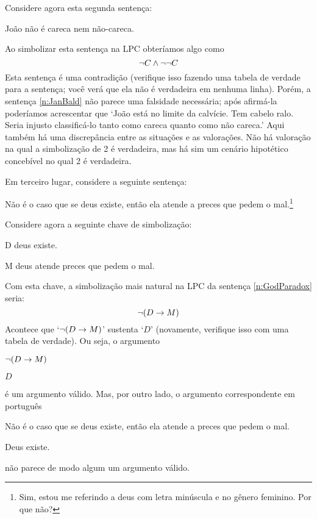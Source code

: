 Considere agora esta segunda sentença:
	\begin{earg} \setcounter{eargnum}{1}
		\item\label{n:JanBald} João não é careca nem não-careca.
	\end{earg}
Ao simbolizar esta sentença na LPC obteríamos algo como
$$\neg C \wedge \neg \neg C$$
Esta sentença é uma contradição (verifique isso fazendo uma tabela de verdade para a sentença; você verá que ela não é verdadeira em nenhuma linha).
Porém, a sentença \ref{n:JanBald} não parece uma falsidade necessária; após afirmá-la poderíamos acrescentar que `João está no limite da calvície.
Tem cabelo ralo. Seria injusto classificá-lo tanto como careca quanto como não careca.'
Aqui também há uma discrepância entre as situações e as valorações.
Não há valoração na qual a simbolização de 2 é verdadeira, mas há sim um cenário hipotético concebível no qual 2 é verdadeira.

Em terceiro lugar, considere a seguinte sentença:
	\begin{earg}
\setcounter{eargnum}{2}	
		\item\label{n:GodParadox}	Não é o caso que se deus existe, então ela atende a preces que pedem o mal.\footnote{ Sim, estou me referindo a deus com letra minúscula e no gênero feminino. Por que não?}
	\end{earg}
Considere agora a seguinte chave de simbolização:
\begin{ekey}
	\item[D] deus existe.
	\item[M] deus atende preces que pedem o mal.
\end{ekey}
Com esta chave, a simbolização mais natural na LPC da sentença \ref{n:GodParadox} seria:
$$\neg (D \rightarrow M)$$
Acontece que `$\neg (D \rightarrow M)$' sustenta `$D$' (novamente, verifique isso com uma tabela de verdade).
Ou seja, o argumento
	\begin{earg}
		\item[] $\neg (D \rightarrow M)$
		\item[\therefore] $D$
	\end{earg}
é um argumento válido.
Mas, por outro lado, o argumento correspondente em português
	\begin{earg}
		\item[] Não é o caso que se deus existe, então ela atende a preces que pedem o mal.
		\item[\therefore] Deus existe.
	\end{earg}
não parece de modo algum um argumento válido.

